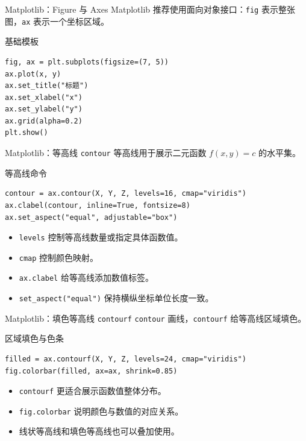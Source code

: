 \documentclass[aspectratio=169,11pt]{ctexbeamer}
\begin{document}
\begin{frame}[fragile]{Matplotlib：Figure 与 Axes}
  Matplotlib 推荐使用面向对象接口：\texttt{fig} 表示整张图，\texttt{ax} 表示一个坐标区域。

  \begin{block}{基础模板}
\begin{Verbatim}[fontsize=\small]
fig, ax = plt.subplots(figsize=(7, 5))
ax.plot(x, y)
ax.set_title("标题")
ax.set_xlabel("x")
ax.set_ylabel("y")
ax.grid(alpha=0.2)
plt.show()
\end{Verbatim}
  \end{block}
\end{frame}

\begin{frame}[fragile]{Matplotlib：等高线 \texttt{contour}}
  等高线用于展示二元函数 \(f(x,y)=c\) 的水平集。

  \begin{block}{等高线命令}
\begin{Verbatim}[fontsize=\small]
contour = ax.contour(X, Y, Z, levels=16, cmap="viridis")
ax.clabel(contour, inline=True, fontsize=8)
ax.set_aspect("equal", adjustable="box")
\end{Verbatim}
  \end{block}

  \begin{itemize}
    \item \texttt{levels} 控制等高线数量或指定具体函数值。
    \item \texttt{cmap} 控制颜色映射。
    \item \texttt{ax.clabel} 给等高线添加数值标签。
    \item \texttt{set\_aspect("equal")} 保持横纵坐标单位长度一致。
  \end{itemize}
\end{frame}

\begin{frame}[fragile]{Matplotlib：填色等高线 \texttt{contourf}}
  \texttt{contour} 画线，\texttt{contourf} 给等高线区域填色。

  \begin{block}{区域填色与色条}
\begin{Verbatim}[fontsize=\small]
filled = ax.contourf(X, Y, Z, levels=24, cmap="viridis")
fig.colorbar(filled, ax=ax, shrink=0.85)
\end{Verbatim}
  \end{block}

  \begin{itemize}
    \item \texttt{contourf} 更适合展示函数值整体分布。
    \item \texttt{fig.colorbar} 说明颜色与数值的对应关系。
    \item 线状等高线和填色等高线也可以叠加使用。
  \end{itemize}
\end{frame}
\end{document}
